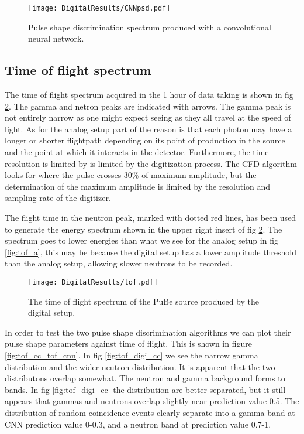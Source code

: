 \documentclass[main.tex]{subfiles}
\begin{document}
\begin{figure}[ht]
    \centering
        \texttt{[image: DigitalResults/CNNpsd.pdf]}
        \caption{Pulse shape discrimination spectrum produced with a convolutional neural network.}
    \label{fig:cnn_E} 
\end{figure}

\clearpage
\subsection{Time of flight spectrum}
The time of flight spectrum acquired in the 1 hour of data taking is shown in fig \ref{fig:tof_d}. The gamma and netron peaks are indicated with arrows. The gamma peak is not entirely narrow as one might expect seeing as they all travel at the speed of light. As for the analog setup part of the reason is that each photon may have a longer or shorter flightpath depending on its point of production in the source and the point at which it interacts in the detector. Furthermore, the time resolution is limited by is limited by the digitization process. The CFD algorithm looks for where the pulse crosses 30\% of maximum amplitude, but the determination of the maximum amplitude is limited by the resolution and sampling rate of the digitizer.

The flight time in the neutron peak, marked with dotted red lines, has been used to generate the energy spectrum shown in the upper right insert of fig \ref{fig:tof_d}. The spectrum goes to lower energies than what we see for the analog setup in fig \ref{fig:tof_a}, this may be because the digital setup has a lower amplitude threshold than the analog setup, allowing slower neutrons to be recorded.
\begin{figure}[ht]
    \centering
        \texttt{[image: DigitalResults/tof.pdf]}
        \caption{The time of flight spectrum of the PuBe source produced by the digital setup.}
    \label{fig:tof_d} 
\end{figure}

In order to test the two pulse shape discrimination algorithms we can plot their pulse shape parameters against time of flight. This is shown in figure \ref{fig:tof_cc_tof_cnn}. In fig \ref{fig:tof_digi_cc} we see the narrow gamma distribution and the wider neutron distribution. It is apparent that the two distributons overlap somewhat. The neutron and gamma background forms to bands.  In fig \ref{fig:tof_digi_cc} the distribution are better separated, but it still appears that gammas and neutrons overlap slightly near prediction value 0.5. The distribution of random coincidence events clearly separate into a gamma band at CNN prediction value 0-0.3, and a neutron band at prediction value 0.7-1.
\end{document}
